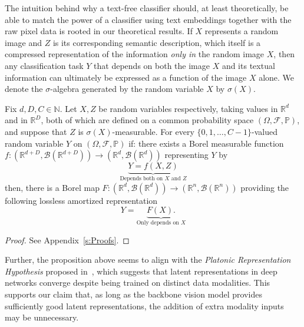 The intuition behind why a text-free classifier should, at least theoretically, be able to match the power of a classifier using text embeddings together with the raw pixel data is rooted in our theoretical results. If $X$ represents a random image and $Z$ is its corresponding semantic description, which itself is a compressed representation of the information \textit{only in} the random image $X$, then any classification task $Y$ that depends on both the image $X$ and its textual information can ultimately be expressed as a function of the image $X$ alone.  
We denote the $\sigma$-algebra generated by the random variable $X$ by $\sigma(X)$.
\begin{proposition}
\label{prop:LosslessAmort}
Fix $d,D,C\in \mathbb{N}$.
Let $X,Z$ be random variables respectively, taking values in $\mathbb{R}^d$ and in $\mathbb{R}^D$, both of which are defined on a common probability space $(\Omega,\mathcal{F},\mathbb{P})$, and suppose that $Z$ is $\sigma(X)$-measurable.  
For every $\{0,1,\dots,C-1\}$-valued random variable $Y$ on $(\Omega,\mathcal{F},\mathbb{P})$ if:
there exists a Borel measurable function $f:
(\mathbb{R}^{d+D},\mathcal{B}(\mathbb{R}^{d+D})) \to (\mathbb{R}^d,\mathcal{B}(\mathbb{R}^d))$ representing $Y$ by
\begin{equation}
\label{eq:uncompressed}
\underbrace{
Y = 
f(X,Z)
}_{\text{Depends both on $X$ and $Z$}}
\end{equation}
then, there is a Borel map $F: (\mathbb{R}^d,\mathcal{B}(\mathbb{R}^d))\to 
(\mathbb{R}^n,\mathcal{B}(\mathbb{R}^n))$ providing the following lossless amortized representation
\begin{equation}
\label{eq:compression}
\tag{LAR}
    Y
= 
\underbrace{
    F(X)
.
}_{\text{Only depends on $X$}}
\end{equation}
\end{proposition}
\begin{proof}
See Appendix~\ref{s:Proofs}.
\end{proof}

Further, the proposition above seems to align with the \textit{Platonic Representation Hypothesis} proposed in~\citep{pmlr-v235-huh24a}, which suggests that latent representations in deep networks converge despite being trained on distinct data modalities. This supports our claim that, as long as the backbone vision model provides sufficiently good latent representations, the addition of extra modality inputs may be unnecessary.


